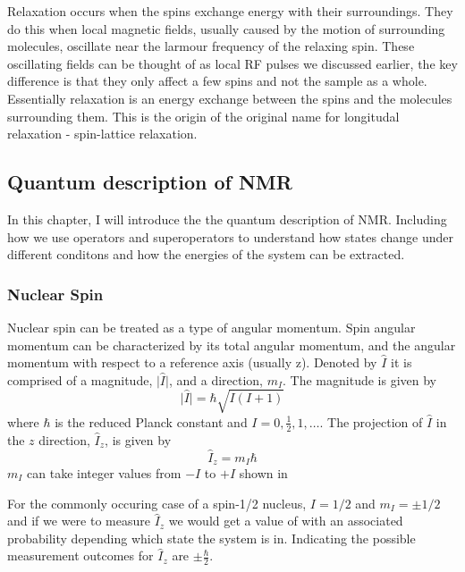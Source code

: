 Relaxation occurs when the spins exchange energy with their surroundings. They do
this when local magnetic fields, usually caused by the motion of surrounding molecules, oscillate
near the larmour frequency of the relaxing spin. These oscillating fields can be thought of
as local RF pulses we discussed earlier, the key difference is that they only affect a few spins
and not the sample as a whole. Essentially relaxation is an energy exchange between the
spins and the molecules surrounding them. This is the origin of the original name for longitudal
relaxation - spin-lattice relaxation.



\subsection{Quantum description of NMR}\label{Quantum}

In this chapter, I will introduce the the quantum description of NMR. Including how
we use operators and superoperators to understand how states change under different conditons and how the energies of the system can be extracted.

\subsubsection{Nuclear Spin}

Nuclear spin can be treated as a type of angular momentum. Spin angular momentum can be characterized by its total
angular momentum, and the angular momentum with respect to a reference axis (usually z).  Denoted by $\hat{I}$
it is comprised of a magnitude, $\lvert\hat{I}\rvert$, and a direction, $m_I$.
The magnitude is given by
\begin{equation}
  \lvert\hat{I}\rvert = \hbar\sqrt{I(I+1)}
\end{equation}
where $\hbar$ is the reduced Planck constant and $I = 0,\frac{1}{2},1,\dots$. The projection of $\hat{I}$ in
the $z$ direction, $\hat{I}_{z}$, is given by
\begin{equation}
  \hat{I}_{z} = m_I\hbar
\end{equation}
$m_{I}$ can take integer values from $-I$ to $+I$ shown in 

For the commonly occuring case of a spin-1/2 nucleus, $I=1/2$ and $m_I = ±1/2$ and if we were to measure $\hat{I}_z$ we would get a value of  with an associated probability depending which state the system is in. Indicating the possible measurement outcomes for $\hat{I}_z$ are $±\frac{\hbar}{2}$.

